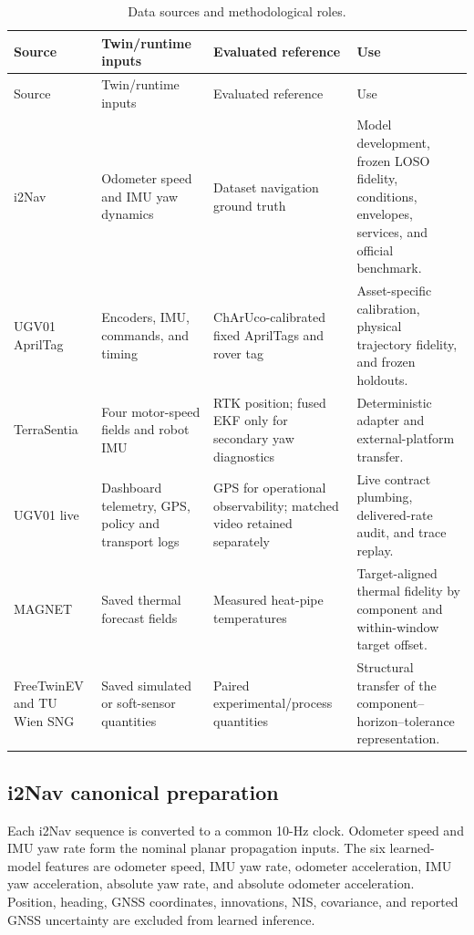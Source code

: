\documentclass[journal,onecolumn]{IEEEtran}
\begin{document}
\begin{longtable}{p{.18\linewidth}p{.22\linewidth}p{.24\linewidth}p{.27\linewidth}}
\caption{Data sources and methodological roles.}\label{tab:data-method}\\
\toprule
Source & Twin/runtime inputs & Evaluated reference & Use \\
\midrule\endfirsthead
\toprule
Source & Twin/runtime inputs & Evaluated reference & Use \\
\midrule\endhead
i2Nav & Odometer speed and IMU yaw dynamics & Dataset navigation ground truth & Model development, frozen LOSO fidelity, conditions, envelopes, services, and official benchmark. \\
UGV01 AprilTag & Encoders, IMU, commands, and timing & ChArUco-calibrated fixed AprilTags and rover tag & Asset-specific calibration, physical trajectory fidelity, and frozen holdouts. \\
TerraSentia & Four motor-speed fields and robot IMU & RTK position; fused EKF only for secondary yaw diagnostics & Deterministic adapter and external-platform transfer. \\
UGV01 live & Dashboard telemetry, GPS, policy and transport logs & GPS for operational observability; matched video retained separately & Live contract plumbing, delivered-rate audit, and trace replay. \\
MAGNET & Saved thermal forecast fields & Measured heat-pipe temperatures & Target-aligned thermal fidelity by component and within-window target offset. \\
FreeTwinEV and TU Wien SNG & Saved simulated or soft-sensor quantities & Paired experimental/process quantities & Structural transfer of the component--horizon--tolerance representation. \\
\bottomrule
\end{longtable}

\subsection{i2Nav canonical preparation}
Each i2Nav sequence is converted to a common 10-Hz clock. Odometer speed and IMU yaw rate form the nominal planar propagation inputs. The six learned-model features are odometer speed, IMU yaw rate, odometer acceleration, IMU yaw acceleration, absolute yaw rate, and absolute odometer acceleration. Position, heading, GNSS coordinates, innovations, NIS, covariance, and reported GNSS uncertainty are excluded from learned inference.
\end{document}
